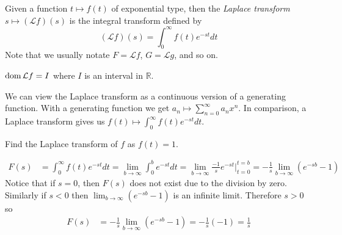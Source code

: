 \documentclass[notes]{subfiles}
\begin{document}
\begin{definition}
    Given a function $t \mapsto f(t)$ of exponential type, then the \textit{Laplace transform} $s \mapsto (\mathcal{L}f)(s)$ is the integral transform defined by
    \[
        (\mathcal{L}f)(s) = \int_0^\infty f(t)e^{-st}dt
    \]
    Note that we usually notate $F = \mathcal{L}f$, $G = \mathcal{L}g$, and so on.
\end{definition}

\begin{theorem}
    $\operatorname{dom} \mathcal{L}f = I$ where $I$ is an interval in $\mathbb{R}$.
\end{theorem}

We can view the Laplace transform as a continuous version of a generating function. With a generating function we get $a_n \mapsto \sum_{n = 0}^\infty a_n x^n$. In comparison, a Laplace transform gives us $f(t) \mapsto \int_0^\infty f(t)e^{-st}dt$.

\begin{exercise} \label{laplace_transform_base_case}
    Find the Laplace transform of $f$ as $f(t) = 1$.
\end{exercise}
\begin{solution}
    \begin{align*}
        F(s)
        &= \int_0^\infty f(t)e^{-st}dt
        = \lim_{b\to\infty} \int_0^b e^{-st}dt
        = \lim_{b\to\infty} \frac{-1}{s}e^{-st}\Big|_{t = 0}^{t = b}
        = -\frac{1}{s} \lim_{b\to\infty} (e^{-sb} - 1)
    \end{align*}
    Notice that if $s = 0$, then $F(s)$ does not exist due to the division by zero. Similarly if $s < 0$ then $\lim_{b\to\infty} (e^{-sb} - 1)$ is an infinite limit. Therefore $s > 0$ so
    \begin{align*}
        F(s)
        &= -\frac{1}{s} \lim_{b\to\infty} (e^{-sb} - 1)
        = -\frac{1}{s}(-1)
        = \frac{1}{s}
    \end{align*}
\end{solution}

\end{document}
